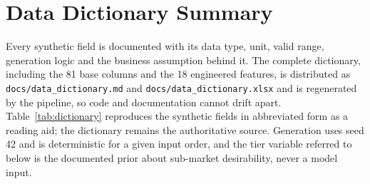 \section{Data Dictionary Summary}
\label{app:dictionary}

Every synthetic field is documented with its data type, unit, valid range,
generation logic and the business assumption behind it. The complete dictionary,
including the 81 base columns and the 18 engineered features, is distributed as
\texttt{docs/data\_dictionary.md} and \texttt{docs/data\_dictionary.xlsx} and is
regenerated by the pipeline, so code and documentation cannot drift apart.
Table~\ref{tab:dictionary} reproduces the synthetic fields in abbreviated form as a
reading aid; the dictionary remains the authoritative source. Generation uses seed 42
and is deterministic for a given input order, and the tier variable referred to below
is the documented prior about sub-market desirability, never a model input.

